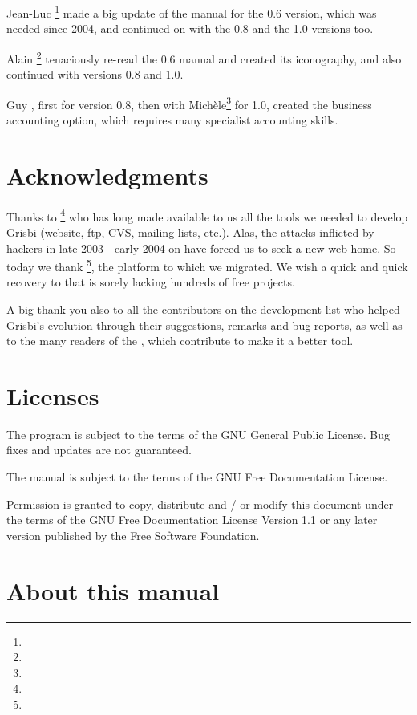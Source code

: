 {Jean-Luc }\footnote{\urlJeanLucDuflotEmail{}} made a big update of the manual for the 0.6 version, which was needed since 2004, and continued on with the 0.8 and the 1.0 versions too.

Alain \footnote{\urlAlainLetientEmail{}} tenaciously re-read the 0.6 manual and created its iconography, and also continued with versions 0.8 and 1.0.

Guy , first for version 0.8, then with {Michèle}\footnote{\urlMicheleBondilEmail{}} for 1.0, created the business accounting option, which requires many specialist accounting skills.

\section{Acknowledgments \label{introduction-thanks}}

Thanks to \footnote{\urlTuxFamily{}} who has long made available to us all the tools we needed to develop Grisbi 
(website, ftp, CVS, mailing lists, etc.). Alas, the attacks inflicted by hackers in late 2003 - early 2004 on  have forced us to seek a new web home. So today we thank \footnote{\urlSourceForge{}}, the platform to which we migrated.  We wish a quick and quick recovery to  that is sorely lacking hundreds of free projects.

A big thank you also to all the contributors on the development list who helped Grisbi's evolution through their suggestions, remarks and bug reports, as well as to the many readers of the , which contribute to make it a better tool.

\section{Licenses \label{introduction-licenses}}

The program is subject to the terms of the \gls{GNU General Public License}.  Bug fixes and updates are not guaranteed.

The manual is subject to the terms of the \gls{GNU Free Documentation License}.

Permission is granted to copy, distribute and / or modify this document under the terms of the GNU Free Documentation License Version 1.1 or any later version published by the Free Software Foundation.

\section{About this manual \label{introduction-manual}}

